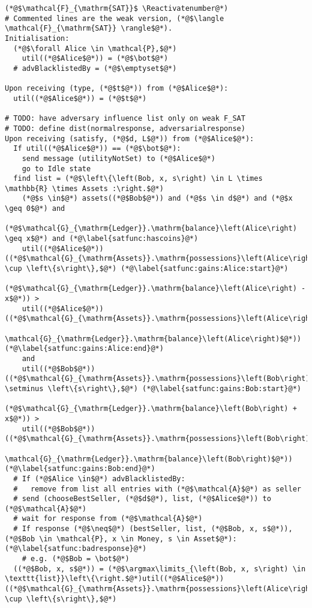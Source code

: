 \Suppressnumber
\begin{lstlisting}[label=satfunc, style=numbers]
(*@$\mathcal{F}_{\mathrm{SAT}}$ \Reactivatenumber@*)
# Commented lines are the weak version, (*@$\langle \mathcal{F}_{\mathrm{SAT}} \rangle$@*).
Initialisation:
  (*@$\forall Alice \in \mathcal{P},$@*)
    util((*@$Alice$@*)) = (*@$\bot$@*)
  # advBlacklistedBy = (*@$\emptyset$@*)

Upon receiving (type, (*@$t$@*)) from (*@$Alice$@*):
  util((*@$Alice$@*)) = (*@$t$@*)

# TODO: have adversary influence list only on weak F_SAT
# TODO: define dist(normalresponse, adversarialresponse)
Upon receiving (satisfy, (*@$d, L$@*)) from (*@$Alice$@*):
  If util((*@$Alice$@*)) == (*@$\bot$@*):
    send message (utilityNotSet) to (*@$Alice$@*)
    go to Idle state
  find list = (*@$\left\{\left(Bob, x, s\right) \in L \times \mathbb{R} \times Assets :\right.$@*)
    (*@$s \in$@*) assets((*@$Bob$@*)) and (*@$s \in d$@*) and (*@$x \geq 0$@*) and
    (*@$\mathcal{G}_{\mathrm{Ledger}}.\mathrm{balance}\left(Alice\right) \geq x$@*) and (*@\label{satfunc:hascoins}@*)
    util((*@$Alice$@*))((*@$\mathcal{G}_{\mathrm{Assets}}.\mathrm{possessions}\left(Alice\right) \cup \left\{s\right\},$@*) (*@\label{satfunc:gains:Alice:start}@*)
        (*@$\mathcal{G}_{\mathrm{Ledger}}.\mathrm{balance}\left(Alice\right) - x$@*)) >
    util((*@$Alice$@*))((*@$\mathcal{G}_{\mathrm{Assets}}.\mathrm{possessions}\left(Alice\right),
    \mathcal{G}_{\mathrm{Ledger}}.\mathrm{balance}\left(Alice\right)$@*)) (*@\label{satfunc:gains:Alice:end}@*)
    and
    util((*@$Bob$@*))((*@$\mathcal{G}_{\mathrm{Assets}}.\mathrm{possessions}\left(Bob\right) \setminus \left\{s\right\},$@*) (*@\label{satfunc:gains:Bob:start}@*)
        (*@$\mathcal{G}_{\mathrm{Ledger}}.\mathrm{balance}\left(Bob\right) + x$@*)) >
    util((*@$Bob$@*))((*@$\mathcal{G}_{\mathrm{Assets}}.\mathrm{possessions}\left(Bob\right),
    \mathcal{G}_{\mathrm{Ledger}}.\mathrm{balance}\left(Bob\right)$@*)) (*@\label{satfunc:gains:Bob:end}@*)
  # If (*@$Alice \in$@*) advBlacklistedBy:
  #   remove from list all entries with (*@$\mathcal{A}$@*) as seller
  # send (chooseBestSeller, (*@$d$@*), list, (*@$Alice$@*)) to (*@$\mathcal{A}$@*)
  # wait for response from (*@$\mathcal{A}$@*)
  # If response (*@$\neq$@*) (bestSeller, list, (*@$Bob, x, s$@*)), (*@$Bob \in \mathcal{P}, x \in Money, s \in Asset$@*): (*@\label{satfunc:badresponse}@*)
    # e.g. (*@$Bob = \bot$@*)
  ((*@$Bob, x, s$@*)) = (*@$\argmax\limits_{\left(Bob, x, s\right) \in \texttt{list}}\left\{\right.$@*)util((*@$Alice$@*))((*@$\mathcal{G}_{\mathrm{Assets}}.\mathrm{possessions}\left(Alice\right) \cup \left\{s\right\},$@*)

\end{lstlisting}
